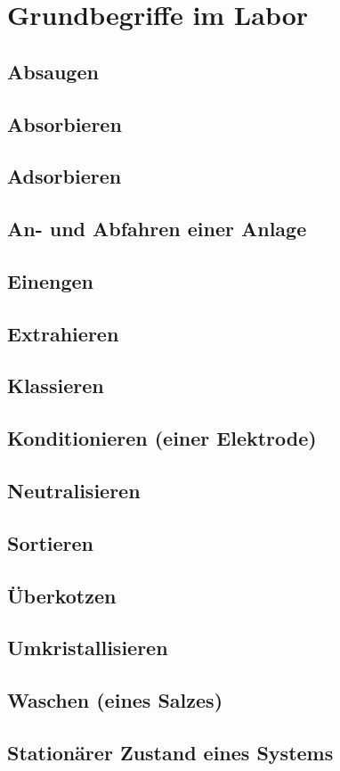 \section{Grundbegriffe im Labor}
\subsection{Absaugen}
\subsection{Absorbieren}
\subsection{Adsorbieren}
\subsection{An- und Abfahren einer Anlage}
\subsection{Einengen}
\subsection{Extrahieren}
\subsection{Klassieren}
\subsection{Konditionieren (einer Elektrode)}
\subsection{Neutralisieren}
\subsection{Sortieren}
\subsection{Überkotzen}
\subsection{Umkristallisieren}
\subsection{Waschen (eines Salzes)}
\subsection{Stationärer Zustand eines Systems}






